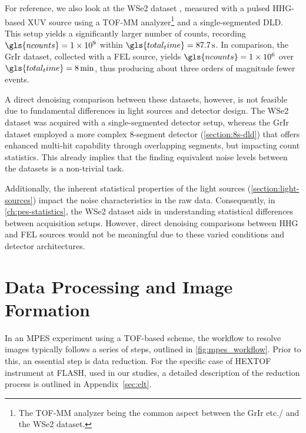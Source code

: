 For reference, we also look at the \gls{WSe2} dataset \cite{maklarTimeresolvedARPESRAW2022}, measured with a pulsed \gls{HHG}-based \gls{XUV} source using a \gls{TOF}-\gls{MM} analyzer\footnote{The \gls{TOF}-\gls{MM} analyzer being the common aspect between the \gls{GrIr} etc./ and the \gls{WSe2} dataset.} and a single-segmented \gls{DLD}. This setup yields a significantly larger number of counts, recording $\gls{ncounts}=\num{1e9}$ within $\gls{total_time}=\qty{87.7}{s}$. In comparison, the \gls{GrIr} dataset, collected with a \gls{FEL} source, yields $\gls{ncounts} = \num{1e6}$ over $\gls{total_time} = \qty{8}{\min}$, thus producing about three orders of magnitude fewer events.

A direct denoising comparison between these datasets, however, is not feasible due to fundamental differences in light sources and detector design. The \gls{WSe2} dataset was acquired with a single-segmented detector setup, whereas the \gls{GrIr} dataset employed a more complex 8-segment detector (\cref{section:8s-dld}) that offers enhanced multi-hit capability through overlapping segments, but impacting count statistics. This already implies that the finding equivalent noise levels between the datasets is a non-trivial task.

Additionally, the inherent statistical properties of the light sources (\cref{section:light-sources}) impact the noise characteristics in the raw data. Consequently, in \cref{ch:pes-statistics}, the \gls{WSe2} dataset aids in understanding statistical differences between acquisition setups. However, direct denoising comparisons between \gls{HHG} and \gls{FEL} sources would not be meaningful due to these varied conditions and detector architectures.

\section{Data Processing and Image Formation}\label{sec:image-formation}

In an \gls{MPES} experiment using a \gls{TOF}-based scheme, the workflow to resolve images typically follows a series of steps, outlined in \cref{fig:mpes_workflow}. Prior to this, an essential step is data reduction. For the specific case of \gls{HEXTOF} instrument at \gls{FLASH}, used in our studies, a detailed description of the reduction process is outlined in Appendix~\ref{sec:elt}.

